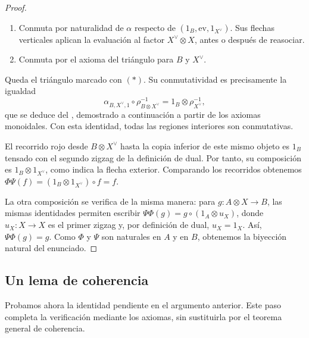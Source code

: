 \begin{proof}
\begin{enumerate}[label=(\roman*)]
\item Conmuta por naturalidad de $\alpha$ respecto de $(1_B,\mathrm{ev},1_{X^\vee})$. Sus flechas verticales aplican la evaluación al factor $X^\vee\otimes X$, antes o después de reasociar.
\item Conmuta por el axioma del triángulo para $B$ y $X^\vee$.
\end{enumerate}
Queda el triángulo marcado con $(\ast)$. Su conmutatividad es precisamente la igualdad
\[
\alpha_{B,X^\vee,1}\circ\rho^{-1}_{B\otimes X^\vee}
=1_B\otimes\rho^{-1}_{X^\vee},
\]
que se deduce del , demostrado a continuación a partir de los axiomas monoidales. Con esta identidad, todas las regiones interiores son conmutativas.

El recorrido rojo desde $B\otimes X^\vee$ hasta la copia inferior de este mismo objeto es $1_B$ tensado con el segundo zigzag de la definición de dual. Por tanto, su composición es $1_B\otimes1_{X^\vee}$, como indica la flecha exterior. Comparando los recorridos obtenemos $\Phi\Psi(f)=(1_B\otimes1_{X^\vee})\circ f=f$.

La otra composición se verifica de la misma manera: para $g\colon A\otimes X\to B$, las mismas identidades permiten escribir $\Psi\Phi(g)=g\circ(1_A\otimes u_X)$, donde $u_X\colon X\to X$ es el primer zigzag
y, por definición de dual, $u_X=1_X$. Así, $\Psi\Phi(g)=g$. Como $\Phi$ y $\Psi$ son naturales en $A$ y en $B$, obtenemos la biyección natural del enunciado.
\end{proof}

\subsection{Un lema de coherencia}

Probamos ahora la identidad pendiente en el argumento anterior. Este paso completa la verificación mediante los axiomas, sin sustituirla por el teorema general de coherencia.

